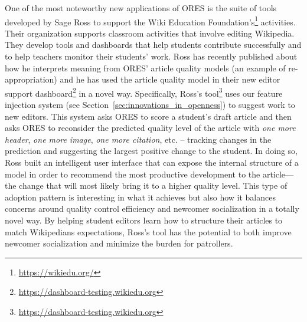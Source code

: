 One of the most noteworthy new applications of ORES is the suite of tools developed by Sage Ross to support the Wiki Education Foundation's\footnote{\url{https://wikiedu.org/}} activities.  Their organization supports classroom activities that involve editing Wikipedia.  They develop tools and dashboards that help students contribute successfully and to help teachers monitor their students' work.  Ross has recently published about how he interprets meaning from ORES' article quality models \cite{ross2016visualizing} (an example of re-appropriation) and he has used the article quality model in their new editor support dashboard\footnote{\url{https://dashboard-testing.wikiedu.org}} in a novel way.  Specifically, Ross's tool\footnote{\url{https://dashboard-testing.wikiedu.org}} uses our feature injection system (see Section~\ref{sec:innovations_in_openness}) to suggest work to new editors.  This system asks ORES to score a student's draft article and then asks ORES to reconsider the predicted quality level of the article with \emph{one more header}, \emph{one more image}, \emph{one more citation}, etc. -- tracking changes in the prediction and suggesting the largest positive change to the student.  In doing so, Ross built an intelligent user interface that can expose the internal structure of a model in order to recommend the most productive development to the article---the change that will most likely bring it to a higher quality level. This type of adoption pattern is interesting in what it achieves but also how it balances concerns around quality control efficiency and newcomer socialization in a totally novel way.  By helping student editors learn how to structure their articles to match Wikipedians expectations, Ross's tool has the potential to both improve newcomer socialization and minimize the burden for patrollers.
